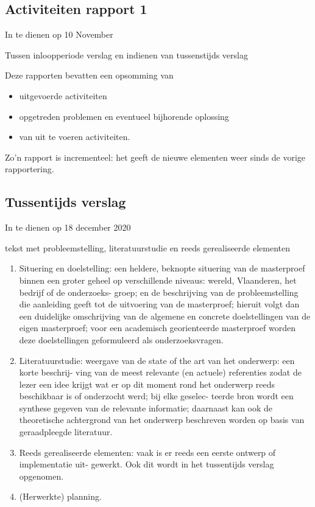 \documentclass{article}
\begin{document}
\subsection{Activiteiten rapport 1}

In te dienen op 10 November



Tussen inloopperiode verslag en indienen van tussenstijds verslag

Deze rapporten bevatten een opsomming van 

\begin{itemize}
\item uitgevoerde activiteiten
\item opgetreden problemen en eventueel bijhorende oplossing
\item van uit te voeren activiteiten.
\end{itemize}
Zo’n rapport is incrementeel: het geeft de nieuwe elementen weer sinds de vorige rapportering.



\subsection{Tussentijds verslag}

In te dienen op 18 december 2020



tekst met probleemstelling, literatuurstudie en reeds gerealiseerde elementen

\begin{enumerate}[1]
\item Situering en doelstelling: een heldere, beknopte situering van de masterproef binnen een groter geheel op verschillende niveaus: wereld, Vlaanderen, het bedrijf of de onderzoeks- groep; en de beschrijving van de probleemstelling die aanleiding geeft tot de uitvoering van de masterproef; hieruit volgt dan een duidelijke omschrijving van de algemene en concrete doelstellingen van de eigen masterproef; voor een academisch georienteerde masterproef worden deze doelstellingen geformuleerd als onderzoeksvragen.
\item Literatuurstudie: weergave van de state of the art van het onderwerp: een korte beschrij- ving van de meest relevante (en actuele) referenties zodat de lezer een idee krijgt wat er op dit moment rond het onderwerp reeds beschikbaar is of onderzocht werd; bij elke geselec- teerde bron wordt een synthese gegeven van de relevante informatie; daarnaast kan ook de theoretische achtergrond van het onderwerp beschreven worden op basis van geraadpleegde literatuur.
\item Reeds gerealiseerde elementen: vaak is er reeds een eerste ontwerp of implementatie uit- gewerkt. Ook dit wordt in het tussentijds verslag opgenomen.
\item (Herwerkte) planning.
\end{enumerate}
\end{document}

